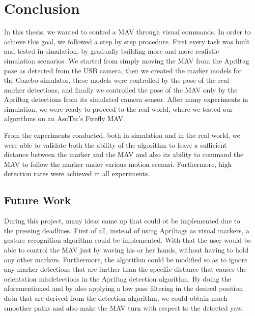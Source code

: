 \chapter{Conclusion}
\label{sec:cocnlusion}

In this thesis, we wanted to control a MAV through visual commands. In order to achieve this goal, we followed a step by step procedure. First every task was built and tested in simulation, by gradually building more and more realistic simulation scenarios. We started from simply moving the MAV from the Apriltag pose as detected from the USB camera, then we created the marker models for the Gazebo simulator, these models were controlled by the pose of the real marker detections, and finally we controlled the pose of the MAV only by the Apriltag detections from its simulated camera sensor. After many experiments in simulation, we were ready to proceed to the real world, where we tested our algorithms on an AscTec's Firefly MAV. 

From the experiments conducted, both in simulation and in the real world, we were able to validate both the ability of the algorithm to leave a sufficient distance between the marker and the MAV and also its ability to command the MAV to follow the marker under various motion scenari. Furthermore, high detection rates were achieved in all experiments.


\section{Future Work}
\label{sec:futureWork}

During this project, many ideas came up that could ot be implemented due to the pressing deadlines. First of all, instead of using Apriltags as visual markers, a gesture recognition algorithm could be implemented. With that the user would be able to control the MAV just by waving his or her hands, without having to hold any other markers. Furthermore, the algorithm could be modified so as to ignore any marker detections that are further than the specific distance that causes the orientation misdetections in the Apriltag detection algorithm. By doing the aforementioned and by also applying a low pass filtering in the desired position data that are derived from the detection algorithm, we could obtain much smoother paths and also make the MAV turn with respect to the detected yaw.